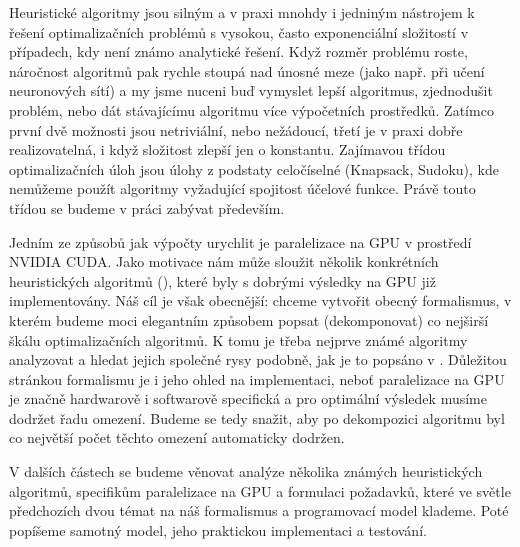 

Heuristické algoritmy jsou silným a v praxi mnohdy i jedniným nástrojem k řešení optimalizačních problémů s vysokou, často exponenciální složitostí v případech, kdy není známo analytické řešení. Když rozměr problému roste, náročnost algoritmů pak rychle stoupá nad únosné meze (jako např. při učení neuronových sítí) a my jsme nuceni buď vymyslet lepší algoritmus, zjednodušit problém, nebo dát stávajícímu algoritmu více výpočetních prostředků. Zatímco první dvě možnosti jsou netriviální, nebo nežádoucí, třetí je v praxi dobře realizovatelná, i když složitost zlepší jen o konstantu. Zajímavou třídou optimalizačních úloh  jsou úlohy z podstaty celočíselné (Knapsack, Sudoku), kde nemůžeme použít algoritmy vyžadující spojitost účelové funkce. Právě touto třídou se budeme v práci zabývat především.


Jedním ze způsobů jak výpočty urychlit je paralelizace na GPU v prostředí NVIDIA CUDA. Jako motivace nám může sloužit několik konkrétních heuristických algoritmů (), které byly s dobrými výsledky na GPU již implementovány. Náš cíl je však obecnější: chceme vytvořit obecný formalismus, v kterém budeme moci elegantním způsobem popsat (dekomponovat) co nejširší škálu optimalizačních algoritmů. K tomu je třeba nejprve známé algoritmy analyzovat a hledat jejich společné rysy podobně, jak je to popsáno v \cite{GO ebook}. Důležitou stránkou formalismu je i jeho ohled na implementaci, neboť paralelizace na GPU je značně hardwarově i softwarově specifická a pro optimální výsledek musíme dodržet řadu omezení. Budeme se tedy snažit, aby po dekompozici algoritmu byl co největší počet těchto omezení automaticky dodržen.



V dalších částech se budeme věnovat analýze několika známých heuristických algoritmů, specifikům paralelizace na GPU a formulaci požadavků, které ve světle předchozích dvou témat na náš formalismus a programovací model klademe. Poté popíšeme samotný model, jeho praktickou implementaci a testování. 